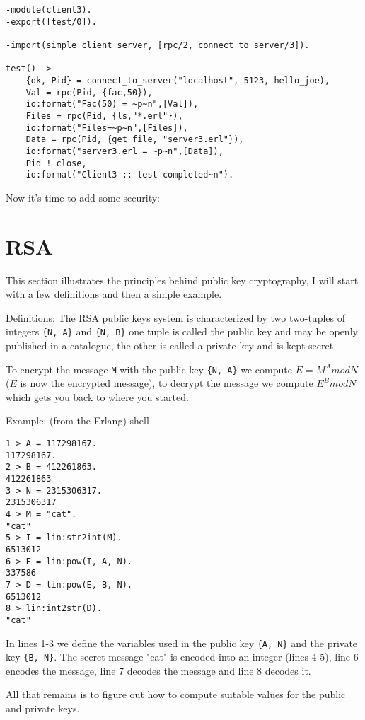 \documentclass[10pt]{article}
\begin{document}
\begin{Verbatim}
-module(client3).
-export([test/0]).

-import(simple_client_server, [rpc/2, connect_to_server/3]).

test() ->
    {ok, Pid} = connect_to_server("localhost", 5123, hello_joe), 
    Val = rpc(Pid, {fac,50}),
    io:format("Fac(50) = ~p~n",[Val]),
    Files = rpc(Pid, {ls,"*.erl"}),
    io:format("Files=~p~n",[Files]),
    Data = rpc(Pid, {get_file, "server3.erl"}),
    io:format("server3.erl = ~p~n",[Data]),
    Pid ! close,
    io:format("Client3 :: test completed~n").
\end{Verbatim}

Now it's time to add some security:

\section{RSA}

This section illustrates the principles behind public key cryptography,
I will start with a few definitions and then a simple example.

    Definitions:   The RSA public keys  system   is characterized by two
two-tuples of integers  \verb+{N, A}+ and  \verb+{N, B}+  one tuple is
called the public key and may be openly published in a catalogue, the
other is called a private key and is kept secret.

    To encrypt the message \verb+M+ with  the public key \verb+{N, A}+
we compute  $E = M^{A} mod N$ ($E$  is now  the  encrypted
message), to decrypt the message  we compute  $E^{B} mod N$  which
gets you back to where you started.

    Example: (from the Erlang) shell

\begin{verbatim}
1 > A = 117298167.
117298167.
2 > B = 412261863.
412261863
3 > N = 2315306317.
2315306317
4 > M = "cat".              
"cat"
5 > I = lin:str2int(M).
6513012
6 > E = lin:pow(I, A, N).
337586
7 > D = lin:pow(E, B, N).
6513012
8 > lin:int2str(D).
"cat"
\end{verbatim}

In lines 1-3 we define the variables used in the 
public key \verb+{A, N}+ and the private
key \verb+{B, N}+. The secret message "cat" is encoded into an integer
(lines 4-5), line 6 encodes the message, line 7 decodes the message
and line 8 decodes it.

    All that remains is to  figure out how  to compute suitable values
for the public and private keys.
\end{document}
